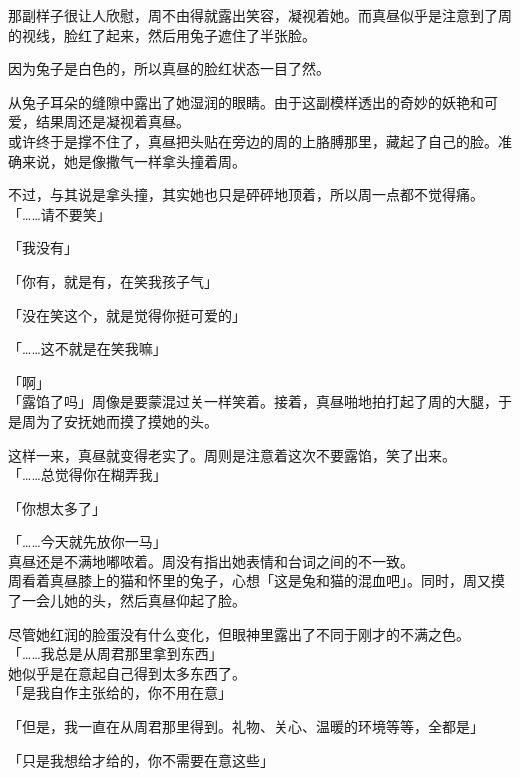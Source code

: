 那副样子很让人欣慰，周不由得就露出笑容，凝视着她。而真昼似乎是注意到了周的视线，脸红了起来，然后用兔子遮住了半张脸。

因为兔子是白色的，所以真昼的脸红状态一目了然。

从兔子耳朵的缝隙中露出了她湿润的眼睛。由于这副模样透出的奇妙的妖艳和可爱，结果周还是凝视着真昼。\\

或许终于是撑不住了，真昼把头贴在旁边的周的上胳膊那里，藏起了自己的脸。准确来说，她是像撒气一样拿头撞着周。

不过，与其说是拿头撞，其实她也只是砰砰地顶着，所以周一点都不觉得痛。\\

「……请不要笑」

「我没有」

「你有，就是有，在笑我孩子气」

「没在笑这个，就是觉得你挺可爱的」

「……这不就是在笑我嘛」

「啊」\\

「露馅了吗」周像是要蒙混过关一样笑着。接着，真昼啪地拍打起了周的大腿，于是周为了安抚她而摸了摸她的头。

这样一来，真昼就变得老实了。周则是注意着这次不要露馅，笑了出来。\\

「……总觉得你在糊弄我」

「你想太多了」

「……今天就先放你一马」\\

真昼还是不满地嘟哝着。周没有指出她表情和台词之间的不一致。\\

周看着真昼膝上的猫和怀里的兔子，心想「这是兔和猫的混血吧」。同时，周又摸了一会儿她的头，然后真昼仰起了脸。

尽管她红润的脸蛋没有什么变化，但眼神里露出了不同于刚才的不满之色。\\

「……我总是从周君那里拿到东西」\\

她似乎是在意起自己得到太多东西了。\\

「是我自作主张给的，你不用在意」

「但是，我一直在从周君那里得到。礼物、关心、温暖的环境等等，全都是」

「只是我想给才给的，你不需要在意这些」\\

